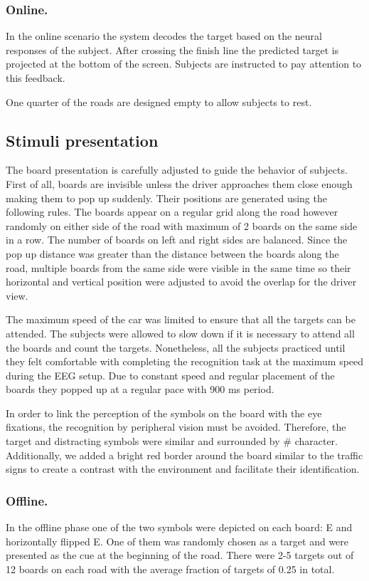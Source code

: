 \documentclass[12pt]{iopart}
\begin{document}
\subsubsection*{Online.}
In the online scenario the system decodes the target based
on the neural responses of the subject. 
After crossing the finish line the predicted target is projected
at the bottom of the screen. Subjects are instructed to pay
attention to this feedback.

One quarter of the roads are designed empty to allow subjects to rest.

\subsection{Stimuli presentation}

The board presentation is carefully adjusted to guide the behavior of subjects.
First of all, boards are invisible unless the driver approaches them
close enough making them to pop up suddenly.
Their positions are generated using the following rules.
The boards appear on a regular grid along the road however
randomly on either side of the road with maximum of 2 boards
on the same side in a row. The number of boards on left
and right sides are balanced. Since the pop up distance was greater
than the distance between the boards along the road, multiple
boards from the same side were visible in the same time
so their horizontal and vertical position were adjusted to avoid
the overlap for the driver view.

The maximum speed of the car was limited to ensure that all the targets
can be attended. The subjects were allowed to slow down if it is necessary
to attend all the boards and count the targets.
Nonetheless, all the subjects practiced until they felt comfortable 
with completing the recognition task at the maximum speed
during the EEG setup.
Due to constant speed and regular placement of the boards they
popped up at a regular pace with 900 ms period.

In order to link the perception of the symbols on the board
with the eye fixations, the recognition by
peripheral vision must be avoided. Therefore, the target and distracting
symbols were similar and surrounded by \# character.
Additionally, we added a bright red border around the board similar 
to the traffic signs
to create a contrast with the environment and facilitate
their identification.

\subsubsection*{Offline.}
In the offline phase one of the two symbols were depicted on each board:
E and horizontally flipped E.
One of them was randomly chosen as a target and were presented as the cue
at the beginning of the road. There were 2-5 targets out of 12 boards
on each road with the average fraction of targets of 0.25 in total.
\end{document}
